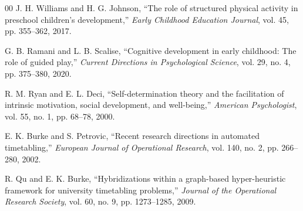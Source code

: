 \documentclass[10pt,conference,compsocconf]{IEEEtran}
\begin{document}
\begin{thebibliography}{00}
 J. H. Williams and H. G. Johnson, ``The role of structured physical activity in preschool children's development,'' \textit{Early Childhood Education Journal}, vol. 45, pp. 355--362, 2017.

 G. B. Ramani and L. B. Scalise, ``Cognitive development in early childhood: The role of guided play,'' \textit{Current Directions in Psychological Science}, vol. 29, no. 4, pp. 375--380, 2020.

 R. M. Ryan and E. L. Deci, ``Self-determination theory and the facilitation of intrinsic motivation, social development, and well-being,'' \textit{American Psychologist}, vol. 55, no. 1, pp. 68--78, 2000.

 E. K. Burke and S. Petrovic, ``Recent research directions in automated timetabling,'' \textit{European Journal of Operational Research}, vol. 140, no. 2, pp. 266--280, 2002.

 R. Qu and E. K. Burke, ``Hybridizations within a graph-based hyper-heuristic framework for university timetabling problems,'' \textit{Journal of the Operational Research Society}, vol. 60, no. 9, pp. 1273--1285, 2009.

\end{thebibliography}
\end{document}
